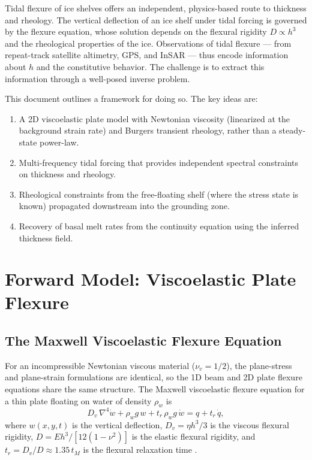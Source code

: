 \documentclass[11pt,letterpaper]{article}
\begin{document}
Tidal flexure of ice shelves offers an independent, physics-based route to thickness and rheology.  The vertical deflection of an ice shelf under tidal forcing is governed by the flexure equation, whose solution depends on the flexural rigidity $D \propto h^3$ and the rheological properties of the ice.  Observations of tidal flexure --- from repeat-track satellite altimetry, GPS, and InSAR --- thus encode information about $h$ and the constitutive behavior.  The challenge is to extract this information through a well-posed inverse problem.

This document outlines a framework for doing so.  The key ideas are:
\begin{enumerate}
  \item A 2D viscoelastic plate model with Newtonian viscosity (linearized at the background strain rate) and Burgers transient rheology, rather than a steady-state power-law.
  \item Multi-frequency tidal forcing that provides independent spectral constraints on thickness and rheology.
  \item Rheological constraints from the free-floating shelf (where the stress state is known) propagated downstream into the grounding zone.
  \item Recovery of basal melt rates from the continuity equation using the inferred thickness field.
\end{enumerate}

\section{Forward Model: Viscoelastic Plate Flexure}
\label{sec:forward}

\subsection{The Maxwell Viscoelastic Flexure Equation}
\label{sec:maxwell_plate}

For an incompressible Newtonian viscous material ($\nu_v = 1/2$), the plane-stress and plane-strain formulations are identical, so the 1D beam and 2D plate flexure equations share the same structure.  The Maxwell viscoelastic flexure equation for a thin plate floating on water of density $\rho_w$ is
\begin{equation}
  D_v\,\nabla^4 \dot{w} + \rho_w g\,w + t_r\,\rho_w g\,\dot{w} = q + t_r\,\dot{q},
  \label{eq:ve_plate}
\end{equation}
where $w(x,y,t)$ is the vertical deflection, $D_v = \eta h^3/3$ is the viscous flexural rigidity, $D = Eh^3/[12(1-\nu^2)]$ is the elastic flexural rigidity, and $t_r = D_v/D \approx 1.35\,t_M$ is the flexural relaxation time \citep[see][Appendix F]{IceRheologyPart2}.
\end{document}
